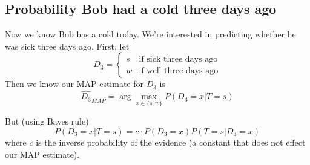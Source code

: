 \documentclass[paper=a4, fontsize=11pt]{scrartcl} %
\numberwithin{equation}{section} %
\numberwithin{figure}{section} %
\numberwithin{table}{section} %
\begin{document}
\subsection{Probability Bob had a cold three days ago}

Now we know Bob has a cold today. We're interested in predicting whether he was sick three days ago. First, let
\[
D_{3} = \begin{cases}
s & \textrm{if sick three days ago}\\
w & \textrm{if well three days ago}
\end{cases}
\]
Then we know our MAP estimate for $D_{3}$ is
\[\hat{D_{3}}_{MAP} = \arg \max_{x \in \{s, w\}} P(D_{3} = x | T = s) \]

But (using Bayes rule)
\[P(D_{3} = x | T = s) = c \cdot P(D_{3} = x)P(T = s | D_{3} = x)\]
where $c$ is the inverse probability of the evidence (a constant that does not effect our MAP estimate).
\end{document}
